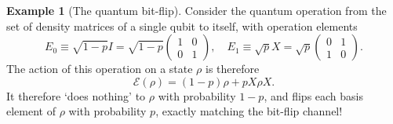 \documentclass[12pt,a4paper]{report}
\numberwithin{equation}{section}
\theoremstyle{definition}
\theoremstyle{theorem}
\theoremstyle{theorem}
\theoremstyle{example}
\newtheorem{example}{Example}[section]
\theoremstyle{definition}
\begin{document}
\begin{example}[The quantum bit-flip]
	Consider the quantum operation from the set of density matrices of a single qubit to itself, with operation elements
	\begin{equation}
		E_{0}\equiv\sqrt{1-p}I=\sqrt{1-p}\begin{pmatrix}
			1&0\\0&1
		\end{pmatrix},\quad E_{1}\equiv\sqrt{p}X=\sqrt{p}\begin{pmatrix}
		0&1\\1&0
	\end{pmatrix}.
	\end{equation}
	The action of this operation on a state $\rho$ is therefore 
	\begin{equation}
		\mathcal{E}(\rho)=(1-p)\rho+pX\rho X.
	\end{equation}
	It therefore `does nothing' to $\rho$ with probability $1-p$, and flips each basis element of $\rho$ with probability $p$, exactly matching the bit-flip channel!
\end{example}
\end{document}
